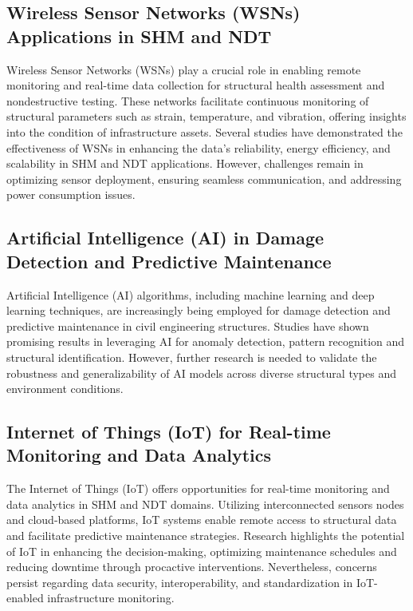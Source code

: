 \documentclass[journal, a4paper]{IEEEtran}
\begin{document}
\subsection{Wireless Sensor Networks (WSNs) Applications in SHM and NDT}
Wireless Sensor Networks (WSNs) play a crucial role in enabling remote monitoring and real-time data collection for
structural health assessment and nondestructive testing. These networks facilitate continuous monitoring of structural
parameters such as strain, temperature, and vibration, offering insights into the condition of infrastructure assets.
Several studies \cite{kang_robotic-based_2021} \cite{katunin_modeling_2021} \cite{fang_structural_2024} have demonstrated the effectiveness of WSNs in enhancing the data’s reliability, energy
efficiency, and scalability in SHM and NDT applications. However, challenges remain in optimizing sensor deployment,
ensuring seamless communication, and addressing power consumption issues.

\subsection{Artificial Intelligence (AI) in Damage Detection and Predictive Maintenance}
Artificial Intelligence (AI) algorithms, including machine learning and deep learning techniques,
are increasingly being employed for damage detection and predictive maintenance in civil engineering structures.
Studies \cite{yang_broadband_2023} \cite{cawley_guided_2024} \cite{zhang_defect_2020} have shown promising results in leveraging AI for anomaly detection,
pattern recognition and structural identification.
However, further research is needed to validate the robustness and generalizability of
AI models across diverse structural types and environment conditions.

\subsection{Internet of Things (IoT) for Real-time Monitoring and Data Analytics}
The Internet of Things (IoT) offers opportunities for real-time monitoring and data analytics in SHM and NDT domains.
Utilizing interconnected sensors nodes and cloud-based platforms, IoT systems enable remote access to structural data
and facilitate predictive maintenance strategies.
Research \cite{prasad_real-time_2024} \cite{willmann_health_2023} \cite{fang_structural_2024} highlights the potential of IoT in enhancing
the decision-making, optimizing maintenance schedules and reducing downtime through procactive interventions.
Nevertheless, concerns persist regarding data security, interoperability, and standardization in IoT-enabled
infrastructure monitoring.
\end{document}
